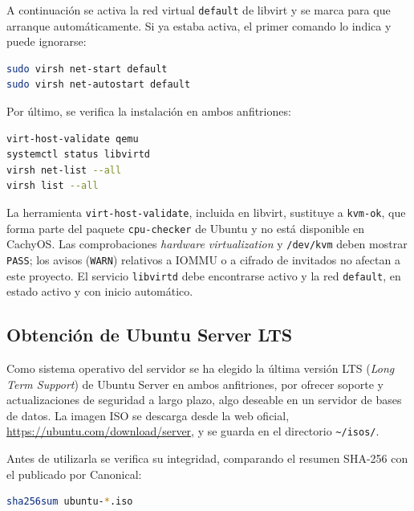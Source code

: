 A continuación se activa la red virtual \texttt{default} de libvirt y se marca para que arranque automáticamente. Si ya estaba activa, el primer comando lo indica y puede ignorarse:

\begin{lstlisting}[language=bash]
sudo virsh net-start default
sudo virsh net-autostart default
\end{lstlisting}

Por último, se verifica la instalación en ambos anfitriones:

\begin{lstlisting}[language=bash]
virt-host-validate qemu
systemctl status libvirtd
virsh net-list --all
virsh list --all
\end{lstlisting}

La herramienta \texttt{virt-host-validate}, incluida en libvirt, sustituye a \texttt{kvm-ok}, que forma parte del paquete \texttt{cpu-checker} de Ubuntu y no está disponible en CachyOS. Las comprobaciones \textit{hardware virtualization} y \texttt{/dev/kvm} deben mostrar \texttt{PASS}; los avisos (\texttt{WARN}) relativos a IOMMU o a cifrado de invitados no afectan a este proyecto. El servicio \texttt{libvirtd} debe encontrarse activo y la red \texttt{default}, en estado activo y con inicio automático.


\subsection{Obtención de Ubuntu Server LTS}

Como sistema operativo del servidor se ha elegido la última versión LTS (\textit{Long Term Support}) de Ubuntu Server en ambos anfitriones, por ofrecer soporte y actualizaciones de seguridad a largo plazo, algo deseable en un servidor de bases de datos. La imagen ISO se descarga desde la web oficial, \url{https://ubuntu.com/download/server}, y se guarda en el directorio \texttt{\textasciitilde/isos/}.

Antes de utilizarla se verifica su integridad, comparando el resumen SHA-256 con el publicado por Canonical:

\begin{lstlisting}[language=bash]
sha256sum ubuntu-*.iso
\end{lstlisting}

